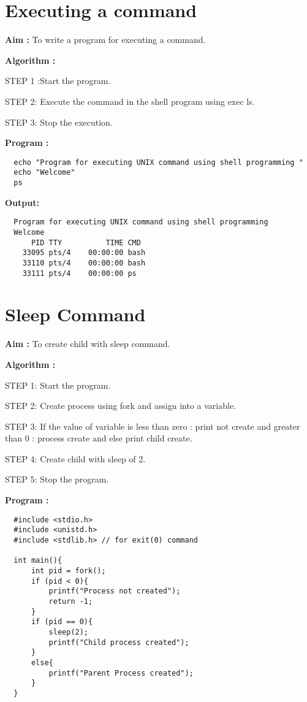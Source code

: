 \documentclass[journal,onecolumn]{IEEEtran}
\begin{document}
\section{Executing a command}
\textbf{Aim : } To write a program for executing a command.

\textbf{Algorithm : }
\begin{list}{}{}
  \item STEP 1 :Start the program.
  \item STEP 2: Execute the command in the shell program using exec ls.
  \item STEP 3: Stop the execution.
\end{list}

\textbf{Program : }
\begin{verbatim}
  echo "Program for executing UNIX command using shell programming "
  echo "Welcome"
  ps
\end{verbatim}

\textbf{Output:}
\begin{verbatim}
  Program for executing UNIX command using shell programming 
  Welcome
      PID TTY          TIME CMD
    33095 pts/4    00:00:00 bash
    33110 pts/4    00:00:00 bash
    33111 pts/4    00:00:00 ps  
\end{verbatim}


\section{Sleep Command}
\textbf{Aim : } To create child with sleep command.

\textbf{Algorithm : }
\begin{list}{}{}
  \item STEP 1: Start the program.
  \item STEP 2: Create process using fork and assign into a variable.
  \item STEP 3: If the value of variable is less than zero : print not create and greater than 0 :  process create
  and else print child create.
  \item STEP 4: Create child with sleep of
  2. 
  \item STEP 5: Stop the program.
\end{list}

\textbf{Program : }
\begin{verbatim}
  #include <stdio.h>
  #include <unistd.h>
  #include <stdlib.h> // for exit(0) command

  int main(){
      int pid = fork();
      if (pid < 0){
          printf("Process not created");
          return -1;
      } 
      if (pid == 0){
          sleep(2);
          printf("Child process created");
      }
      else{
          printf("Parent Process created");
      }
  }
\end{verbatim}
\end{document}
